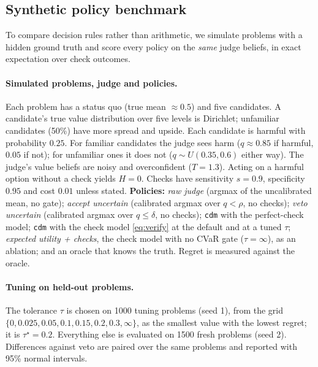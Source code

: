 \documentclass[11pt]{article}
\theoremstyle{definition}
\begin{document}
\subsection{Synthetic policy benchmark}\label{sec:benchmark}

To compare decision rules rather than arithmetic, we simulate problems with a hidden ground truth
and score every policy on the \emph{same} judge beliefs, in exact expectation over check outcomes.

\paragraph{Simulated problems, judge and policies.} Each problem has a status quo (true mean $\approx0.5$) and five candidates. A
candidate's true value distribution over five levels is Dirichlet; unfamiliar candidates (50\%) have
more spread and upside. Each candidate is harmful with probability $0.25$. For familiar candidates
the judge sees harm ($q\approx0.85$ if harmful, $0.05$ if not); for unfamiliar ones it does not
($q\sim U(0.35,0.6)$ either way). The judge's value beliefs are noisy and overconfident ($T=1.3$).
Acting on a harmful option without a check yields $H=0$. Checks have sensitivity $s=0.9$,
specificity $0.95$ and cost $0.01$ unless stated. \textbf{Policies:} \emph{raw judge} (argmax of the
uncalibrated mean, no gate); \emph{accept uncertain} (calibrated argmax over $q<\rho$, no checks);
\emph{veto uncertain} (calibrated argmax over $q\le\delta$, no checks); \texttt{cdm} with the
perfect-check model; \texttt{cdm} with the check model \eqref{eq:verify} at the default and at a
tuned $\tau$; \emph{expected utility + checks}, the check model with no CVaR gate ($\tau=\infty$),
as an ablation; and an oracle that knows the truth. Regret is measured against the oracle.

\paragraph{Tuning on held-out problems.} The tolerance $\tau$ is chosen on 1000 tuning problems
(seed 1), from the grid $\{0,0.025,0.05,0.1,0.15,0.2,0.3,\infty\}$, as the smallest value with the
lowest regret; it is
$\tau^\star=0.2$. Everything else is evaluated on 1500 fresh problems (seed 2). Differences against
veto are paired over the same problems and reported with 95\% normal intervals.
\end{document}
